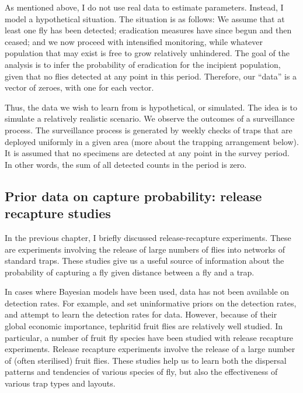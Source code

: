 \documentclass[
]{book}
\begin{document}
As mentioned above, I do not use real data to estimate parameters. Instead, I model a hypothetical situation. The situation is as follows: We assume that at least one fly has been detected; eradication measures have since begun and then ceased; and we now proceed with intensified monitoring, while whatever population that may exist is free to grow relatively unhindered. The goal of the analysis is to infer the probability of eradication for the incipient population, given that no flies detected at any point in this period. Therefore, our ``data'' is a vector of zeroes, with one for each vector.

Thus, the data we wish to learn from is hypothetical, or simulated. The idea is to simulate a relatively realistic scenario. We observe the outcomes of a surveillance process. The surveillance process is generated by weekly checks of traps that are deployed uniformly in a given area (more about the trapping arrangement below). It is assumed that no specimens are detected at any point in the survey period. In other words, the sum of all detected counts in the period is zero.

\hypertarget{prior-data-on-capture-probability-release-recapture-studies}{%
\subsection{Prior data on capture probability: release recapture studies}\label{prior-data-on-capture-probability-release-recapture-studies}}

In the previous chapter, I briefly discussed release-recapture experiments. These are experiments involving the release of large numbers of flies into networks of standard traps. These studies give us a useful source of information about the probability of capturing a fly given distance between a fly and a trap.

In cases where Bayesian models have been used, data has not been available on detection rates. For example, \citet{caley2014} and \citet{keith2013} set uninformative priors on the detection rates, and attempt to learn the detection rates for data. However, because of their global economic importance, tephritid fruit flies are relatively well studied. In particular, a number of fruit fly species have been studied with release recapture experiments. Release recapture experiments involve the release of a large number of (often sterilised) fruit flies. These studies help us to learn both the dispersal patterns and tendencies of various species of fly, but also the effectiveness of various trap types and layouts.
\end{document}
